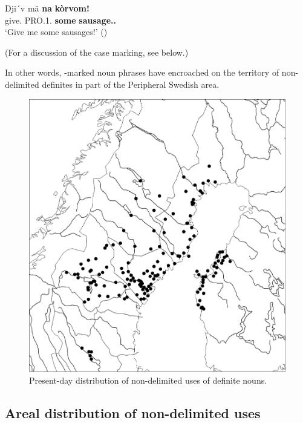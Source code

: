\z

\ea
\gll Dji´v  mä  \textbf{na} \textbf{  kòrvom!}\\
give.{\imp}  PRO.1{\sg}.{\obl}  \textbf{some} \textbf{sausage.{\dat}.{\pl}}\\
\glt ‘Give me some sausages!’ (\citet[19]{Brännström1993})

\z

(For a discussion of the case marking, see  below.) 

In other words, -marked noun phrases have encroached on the territory of non-delimited definites in part of the Peripheral Swedish area. 

\begin{figure}[h]
\includegraphics[height=.3\textheight]{figures/13_PresentDayDistribution}
\caption{Present-day distribution of non-delimited uses of definite nouns.}
\label{map:11}

\end{figure}

\subsection{ Areal distribution of non-delimited uses}

